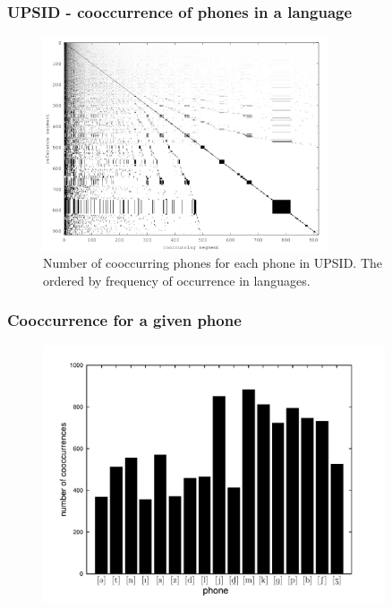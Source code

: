 \documentclass[notes]{beamer}
\begin{document}
\frame
{
  \frametitle{UPSID - cooccurrence of phones in a language}
  \begin{figure}[h!]
  \centering
  \includegraphics[width=0.75\textwidth]{imagespresentation/cooccurrence_matrix_upsid.png}
  \caption{Number of cooccurring phones for each phone in UPSID. The ordered by frequency of occurrence in languages.}
  \label{fig:cooccurrence_matrix_upsid}
  \end{figure}
}



\frame
{
  \frametitle{Cooccurrence for a given phone}
  \vspace{-0.5cm}
  \begin{figure}[h!]
  \centering
  \includegraphics[width=0.9\textwidth]{images/num_cooccurring_phones.pdf}
  \label{fig:numper_cooccurring_phones}
  \end{figure} 
}
\end{document}
